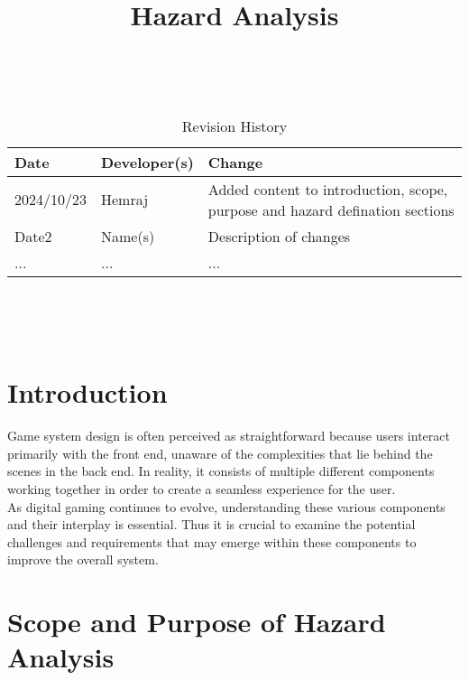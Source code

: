 \documentclass{article}
\title{Hazard Analysis\\\progname}
\author{\authname}
\date{}
\begin{document}
\maketitle
\thispagestyle{empty}

~\newpage


\begin{table}[hp]
\caption{Revision History} \label{TblRevisionHistory}
\begin{tabularx}{\textwidth}{llX}
\toprule
\textbf{Date} & \textbf{Developer(s)} & \textbf{Change}\\
\midrule
2024/10/23 & Hemraj & Added content to introduction, scope, purpose and hazard defination sections\\
Date2 & Name(s) & Description of changes\\
... & ... & ...\\
\bottomrule
\end{tabularx}
\end{table}

~\newpage

\tableofcontents

~\newpage



\section{Introduction}

Game system design is often perceived as straightforward because users interact primarily with the front end, unaware of the complexities that lie behind the scenes in the back end. In reality, it consists of multiple different components working together in order to create a seamless experience for the user.\\

As digital gaming continues to evolve, understanding these various components and their interplay is essential. Thus it is crucial to examine the potential challenges and requirements that may emerge within these components to improve the overall system.


\section{Scope and Purpose of Hazard Analysis}
\end{document}
